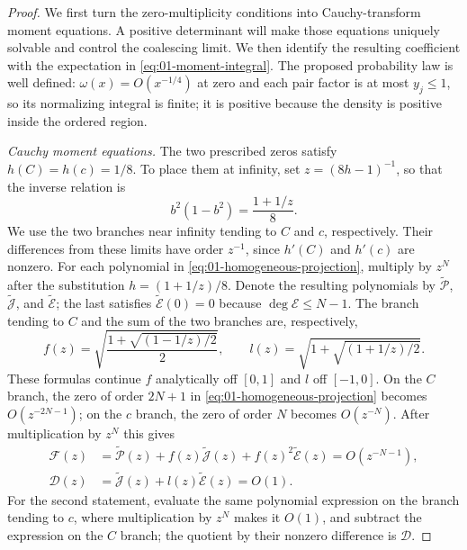 \begin{proof}
We first turn the zero-multiplicity conditions into Cauchy-transform
moment equations. A positive determinant will make those equations
uniquely solvable and control the coalescing limit. We then identify the
resulting coefficient with the expectation in
\eqref{eq:01-moment-integral}.
The proposed probability law is well defined: $\omega(x)=O(x^{-1/4})$
at zero and each pair factor is at most $y_j\le1$, so its normalizing
integral is finite; it is positive because the density is positive
inside the ordered region.

\smallskip\noindent\emph{Cauchy moment equations.}
The two prescribed zeros satisfy $h(C)=h(c)=1/8$. To place them at
infinity, set $z=(8h-1)^{-1}$, so that the inverse relation is
\[
 b^2(1-b^2)=\frac{1+1/z}{8}.
\]
We use the two branches near infinity tending to $C$ and $c$, respectively.
Their differences from these limits have order $z^{-1}$, since
$h'(C)$ and $h'(c)$ are nonzero. For each polynomial in
\eqref{eq:01-homogeneous-projection}, multiply by $z^N$ after the
substitution $h=(1+1/z)/8$. Denote the resulting polynomials by
$\widetilde{\mathcal P}$, $\widetilde{\mathcal J}$, and
$\widetilde{\mathcal E}$; the last satisfies
$\widetilde{\mathcal E}(0)=0$ because $\deg\mathcal E\le N-1$.
The branch tending to $C$ and the sum of the two branches are, respectively,
\[
 f(z)=\sqrt{\frac{1+\sqrt{(1-1/z)/2}}2},\qquad
 l(z)=\sqrt{1+\sqrt{(1+1/z)/2}}.
\]
These formulas continue $f$ analytically off $[0,1]$ and $l$ off
$[-1,0]$. On the $C$ branch, the zero of order $2N+1$ in
\eqref{eq:01-homogeneous-projection} becomes $O(z^{-2N-1})$; on the
$c$ branch, the zero of order $N$ becomes $O(z^{-N})$.
After multiplication by $z^N$ this gives
\begin{align}
 \mathcal F(z)&=\widetilde{\mathcal P}(z)
        +f(z)\widetilde{\mathcal J}(z)
        +f(z)^2\widetilde{\mathcal E}(z)=O(z^{-N-1}),
        \label{eq:01-F-decay}\\
 \mathcal D(z)&=\widetilde{\mathcal J}(z)
                 +l(z)\widetilde{\mathcal E}(z)=O(1).
        \label{eq:01-D-decay}
\end{align}
For the second statement, evaluate the same polynomial expression
on the branch tending to $c$, where multiplication by $z^N$ makes
it $O(1)$, and subtract the expression on the $C$ branch; the
quotient by their nonzero difference is $\mathcal D$.


\end{proof}

